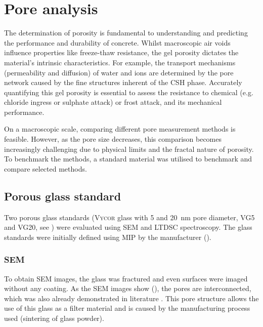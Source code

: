 \chapter{Pore analysis}

The determination of porosity is fundamental to understanding and predicting the performance and durability of concrete.
Whilst macroscopic air voids influence properties like freeze-thaw resistance, the gel porosity dictates the material's intrinsic characteristics.
For example, the transport mechanisms (permeability and diffusion) of water and ions are determined by the pore network caused by the fine structures inherent of the \ac{CSH} phase.
Accurately quantifying this gel porosity is essential to assess the resistance to chemical (e.g. chloride ingress or sulphate attack) or frost attack, and its mechanical performance.

On a macroscopic scale, comparing different pore measurement methods is feasible.
However, as the pore size decreases, this comparison becomes increasingly challenging due to physical limits and the fractal nature of porosity.
To benchmark the methods, a standard material was utilised to benchmark and compare selected methods.

\section{Porous glass standard}

Two porous glass standards (\textsc{Vycor} glass with \num{5} and \qty{20}{\nano\meter} pore diameter, \acs{VG5} and \acs{VG20}, see ) were evaluated using \ac{SEM} and \ac{LTDSC} spectroscopy.
The glass standards were initially defined using \ac{MIP} by the manufacturer (). %

\subsection{\acs*{SEM}}

To obtain \ac{SEM} images, the glass was fractured and even surfaces were imaged without any coating.
As the \ac{SEM} images show (), the pores are interconnected, which was also already demonstrated in literature \cite{levitz.1998, levitz.2007}.
This pore structure allows the use of this glass as a filter material and is caused by the manufacturing process used (sintering of glass powder).

